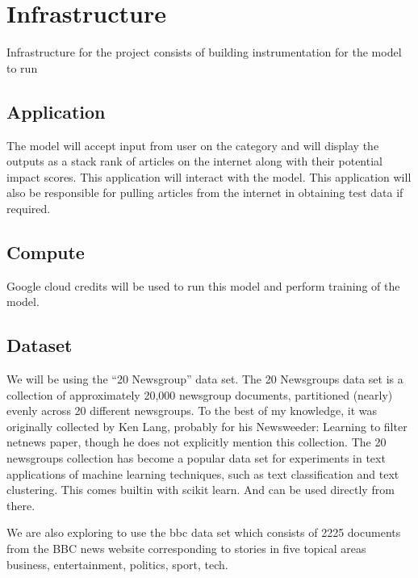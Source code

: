 \documentclass{article}
\begin{document}
 

\section{Infrastructure} %
Infrastructure for the project consists of building instrumentation for the model to run

\subsection{Application}
The model will accept input from user on the category and will display the outputs as a stack rank of articles on the internet along with their potential impact scores. This application will interact with the model. This application will also be responsible for pulling articles from the internet in obtaining test data if required.

\subsection{Compute}
Google cloud credits will be used to run this model and perform training of the model. 

\subsection{Dataset}
We will be using the “20 Newsgroup” data set. The 20 Newsgroups data set is a collection of approximately 20,000 newsgroup documents, partitioned (nearly) evenly across 20 different newsgroups. To the best of my knowledge, it was originally collected by Ken Lang, probably for his Newsweeder: Learning to filter netnews paper, though he does not explicitly mention this collection. The 20 newsgroups collection has become a popular data set for experiments in text applications of machine learning techniques, such as text classification and text clustering. This comes builtin with scikit learn. And can be used directly from there. 

We are also exploring to use the bbc data set which consists of 2225 documents from the BBC news website corresponding to stories in five topical areas business, entertainment, politics, sport, tech. 

\maketitle %
\end{document}
